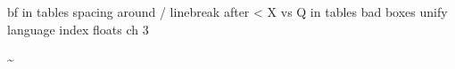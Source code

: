 bf in tables  
spacing around /
linebreak after <
X vs Q in tables
bad boxes
unify language index
floats ch 3 

\textasciitilde 